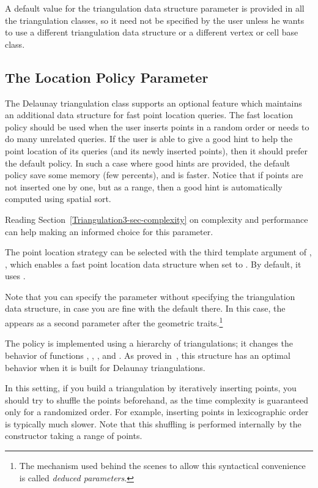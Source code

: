 A default value for the triangulation data structure parameter is provided in
all the triangulation classes, so it need not be specified by the user unless
he wants to use a different triangulation data structure or a different vertex
or cell base class.

\subsection{The Location Policy Parameter\label{Triangulation3-sec-locpol}}

The Delaunay triangulation class supports an optional feature which maintains
an additional data structure for fast point location queries.  
The fast location policy should be used when the user inserts points in a random
order or needs to do many unrelated queries.
If the user is able to give a good hint to help the point  location of
 its queries (and its newly inserted points), then it should prefer the default
 policy. In such a case where good hints are provided,
the default policy save some memory (few percents), and is faster.
Notice that if points are not inserted one by one, but as a  range, then a good hint is 
automatically computed using spatial sort.

Reading Section~\ref{Triangulation3-sec-complexity} on complexity and
performance can help making an informed choice for this parameter.

The point location strategy can be selected with the third template argument of
, , which enables a fast
point location data structure when set to .  By default, it
uses .

Note that you can specify the  parameter without specifying
the triangulation data structure, in case you are fine with the default there.
In this case, the  appears as a second parameter after the
geometric traits.\footnote{The mechanism used behind the scenes to allow this
syntactical convenience is called \textit{deduced parameters}.} 

The  policy is implemented using a hierarchy of
triangulations; it changes the behavior of functions ,
, , and .
As proved in~\cite{cgal:d-dh-02}, this structure has an
optimal behavior when it is built for Delaunay triangulations.

In this setting, if you build a triangulation by iteratively inserting points,
you should try to shuffle the points beforehand, as the time complexity is
guaranteed only for a randomized order.  For example, inserting points in
lexicographic order is typically much slower.  Note that this shuffling is
performed internally by the constructor taking a range of points.

